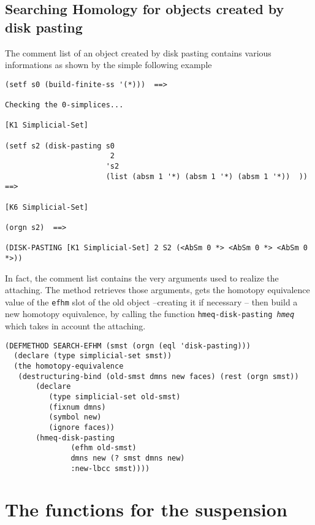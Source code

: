 \subsection {Searching Homology for objects created by disk pasting}

The comment list of an object created by disk pasting
contains various informations as shown by the simple following example
{\footnotesize\begin{verbatim}
(setf s0 (build-finite-ss '(*)))  ==>

Checking the 0-simplices...

[K1 Simplicial-Set]

(setf s2 (disk-pasting s0 
                        2 
                       's2 
                       (list (absm 1 '*) (absm 1 '*) (absm 1 '*))  ))  ==>

[K6 Simplicial-Set]

(orgn s2)  ==>

(DISK-PASTING [K1 Simplicial-Set] 2 S2 (<AbSm 0 *> <AbSm 0 *> <AbSm 0 *>))
\end{verbatim}}
In fact, the comment list contains the very arguments used to realize the attaching.
The method retrieves those arguments, gets the homotopy equivalence value of the
{\tt efhm} slot of the old object --creating it if necessary -- then build
a new homotopy equivalence, by calling the function {\tt hmeq-disk-pasting {\em hmeq}} which 
takes in account the attaching.
{\footnotesize\begin{verbatim}
(DEFMETHOD SEARCH-EFHM (smst (orgn (eql 'disk-pasting)))
  (declare (type simplicial-set smst))
  (the homotopy-equivalence
   (destructuring-bind (old-smst dmns new faces) (rest (orgn smst))
       (declare
          (type simplicial-set old-smst)
          (fixnum dmns)
          (symbol new)
          (ignore faces))
       (hmeq-disk-pasting 
               (efhm old-smst)
               dmns new (? smst dmns new)
               :new-lbcc smst))))
\end{verbatim}}
\newpage

\section {The functions for the suspension}

